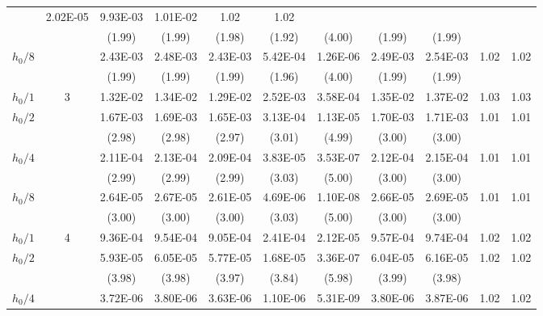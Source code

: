 \documentclass[compress]{beamer}
\begin{document}
\begin{frame}[shrink=10]
{\begin{tabular}{|cc|cc|ccc|cc|rr|}
 &   2.02E-05
 &   9.93E-03
 &   1.01E-02
 &     \alert{1.02}
 &     1.02
\\[-0.01cm]
   \multicolumn{2}{|c|}{{}}
 & (1.99)
 & (1.99)
 & (1.98)
 & (1.92)
 & (4.00)
 & (1.99)
 & (1.99)
  &
  &
\\[-0.01cm]
$h_0/8$
 &
 &   2.43E-03
 &   2.48E-03
 &   2.43E-03
 &   5.42E-04
 &   1.26E-06
 &   2.49E-03
 &   2.54E-03
 &     \alert{1.02}
 &     1.02
\\[-0.01cm]
   \multicolumn{2}{|c|}{{}}
 & (1.99)
 & (1.99)
 & (1.99)
 & (1.96)
 & (4.00)
 & (1.99)
 & (1.99)
  &
  &
\\[-0.01cm]
 \hline
$h_0/1$
 &   \alert{3}
 &   1.32E-02
 &   1.34E-02
 &   1.29E-02
 &   2.52E-03
 &   3.58E-04
 &   1.35E-02
 &   1.37E-02
 &     \alert{1.03}
 &     1.03
\\[-0.01cm]
$h_0/2$
 &
 &   1.67E-03
 &   1.69E-03
 &   1.65E-03
 &   3.13E-04
 &   1.13E-05
 &   1.70E-03
 &   1.71E-03
 &     \alert{1.01}
 &     1.01
\\[-0.01cm]
   \multicolumn{2}{|c|}{{}}
 & (2.98)
 & (2.98)
 & (2.97)
 & (3.01)
 & (4.99)
 & (3.00)
 & (3.00)
  &
  &
\\[-0.01cm]
$h_0/4$
 &
 &   2.11E-04
 &   2.13E-04
 &   2.09E-04
 &   3.83E-05
 &   3.53E-07
 &   2.12E-04
 &   2.15E-04
 &     \alert{1.01}
 &     1.01
\\[-0.01cm]
   \multicolumn{2}{|c|}{{}}
 & (2.99)
 & (2.99)
 & (2.99)
 & (3.03)
 & (5.00)
 & (3.00)
 & (3.00)
  &
  &
\\[-0.01cm]
$h_0/8$
 &
 &   2.64E-05
 &   2.67E-05
 &   2.61E-05
 &   4.69E-06
 &   1.10E-08
 &   2.66E-05
 &   2.69E-05
 &     \alert{1.01}
 &     1.01
\\[-0.01cm]
   \multicolumn{2}{|c|}{{}}
 & (3.00)
 & (3.00)
 & (3.00)
 & (3.03)
 & (5.00)
 & (3.00)
 & (3.00)
  &
  &
\\[-0.01cm]
 \hline
$h_0/1$
 &   \alert{4}
 &   9.36E-04
 &   9.54E-04
 &   9.05E-04
 &   2.41E-04
 &   2.12E-05
 &   9.57E-04
 &   9.74E-04
 &     \alert{1.02}
 &     1.02
\\[-0.01cm]
$h_0/2$
 &
 &   5.93E-05
 &   6.05E-05
 &   5.77E-05
 &   1.68E-05
 &   3.36E-07
 &   6.04E-05
 &   6.16E-05
 &     \alert{1.02}
 &     1.02
\\[-0.01cm]
   \multicolumn{2}{|c|}{{}}
 & (3.98)
 & (3.98)
 & (3.97)
 & (3.84)
 & (5.98)
 & (3.99)
 & (3.98)
  &
  &
\\[-0.01cm]
$h_0/4$
 &
 &   3.72E-06
 &   3.80E-06
 &   3.63E-06
 &   1.10E-06
 &   5.31E-09
 &   3.80E-06
 &   3.87E-06
 &     \alert{1.02}
 &     1.02

\end{tabular}}
\end{frame}
\end{document}
